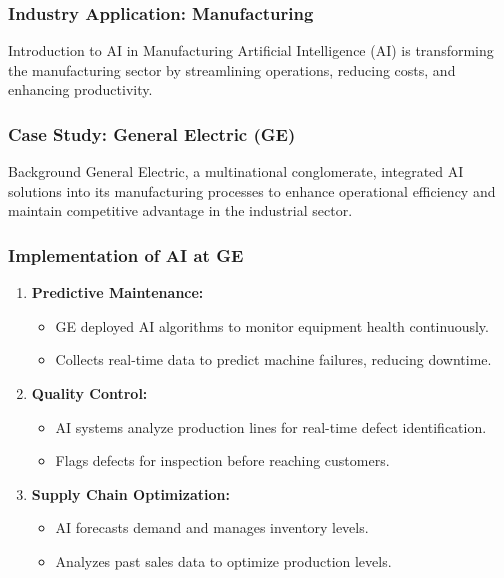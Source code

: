\documentclass{beamer}
\begin{document}
\begin{frame}[fragile]
    \frametitle{Industry Application: Manufacturing}
    \begin{block}{Introduction to AI in Manufacturing}
        Artificial Intelligence (AI) is transforming the manufacturing sector by streamlining operations, reducing costs, and enhancing productivity. 
    \end{block}
\end{frame}

\begin{frame}[fragile]
    \frametitle{Case Study: General Electric (GE)}
    \begin{block}{Background}
        General Electric, a multinational conglomerate, integrated AI solutions into its manufacturing processes to enhance operational efficiency and maintain competitive advantage in the industrial sector.
    \end{block}
\end{frame}

\begin{frame}[fragile]
    \frametitle{Implementation of AI at GE}
    \begin{enumerate}
        \item \textbf{Predictive Maintenance:}
            \begin{itemize}
                \item GE deployed AI algorithms to monitor equipment health continuously.
                \item Collects real-time data to predict machine failures, reducing downtime.
            \end{itemize}
        \item \textbf{Quality Control:}
            \begin{itemize}
                \item AI systems analyze production lines for real-time defect identification.
                \item Flags defects for inspection before reaching customers.
            \end{itemize}
        \item \textbf{Supply Chain Optimization:}
            \begin{itemize}
                \item AI forecasts demand and manages inventory levels.
                \item Analyzes past sales data to optimize production levels.
            \end{itemize}
    \end{enumerate}
\end{frame}
\end{document}

